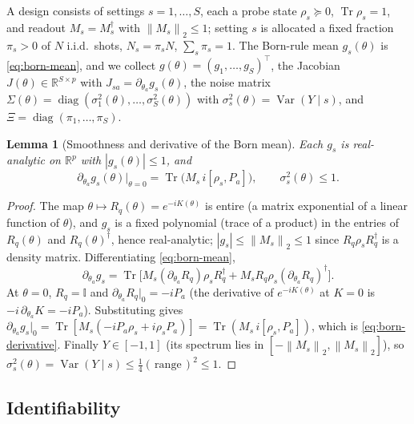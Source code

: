 \documentclass[aps,prxquantum,reprint,superscriptaddress,nofootinbib,amsmath,amssymb]{revtex4-2}
\newcommand{\norm}[1]{\left\lVert #1 \right\rVert}
\newcommand{\abs}[1]{\left\lvert #1 \right\rvert}
\newcommand{\Tr}{\operatorname{Tr}}
\newcommand{\id}{\mathbb{I}}
\newtheorem{lemma}{Lemma}
\begin{document}
A design consists of settings $s=1,\dots,S$, each a probe state $\rho_s\succeq0$, $\Tr\rho_s=1$, and readout $M_s=M_s^\dagger$ with $\norm{M_s}_2\leq1$; setting $s$ is allocated a fixed fraction $\pi_s>0$ of $N$ i.i.d.\ shots, $N_s=\pi_sN$, $\sum_s\pi_s=1$. The Born-rule mean $g_s(\theta)$ is \eqref{eq:born-mean}, and we collect $g(\theta)=(g_1,\dots,g_S)^\top$, the Jacobian $J(\theta)\in\mathbb{R}^{S\times p}$ with $J_{sa}=\partial_{\theta_a}g_s(\theta)$, the noise matrix $\Sigma(\theta)=\operatorname{diag}(\sigma_1^2(\theta),\dots,\sigma_S^2(\theta))$ with $\sigma_s^2(\theta)=\operatorname{Var}(Y\mid s)$, and $\Xi=\operatorname{diag}(\pi_1,\dots,\pi_S)$.

\begin{lemma}[Smoothness and derivative of the Born mean]
\label{lem:born-smooth}
Each $g_s$ is real-analytic on $\mathbb{R}^p$ with $\abs{g_s(\theta)}\leq1$, and
\begin{equation}
    \partial_{\theta_a}g_s(\theta)\big|_{\theta=0}=\Tr\!\bigl(M_s\,i[\rho_s,P_a]\bigr),
    \qquad
    \sigma_s^2(\theta)\leq1 .
    \label{eq:born-derivative}
\end{equation}
\end{lemma}

\begin{proof}
The map $\theta\mapsto R_q(\theta)=e^{-iK(\theta)}$ is entire (a matrix exponential of a linear function of $\theta$), and $g_s$ is a fixed polynomial (trace of a product) in the entries of $R_q(\theta)$ and $R_q(\theta)^\dagger$, hence real-analytic; $\abs{g_s}\leq\norm{M_s}_2\leq1$ since $R_q\rho_sR_q^\dagger$ is a density matrix. Differentiating \eqref{eq:born-mean},
\begin{equation*}
    \partial_{\theta_a}g_s=\Tr\!\bigl[M_s(\partial_{\theta_a}R_q)\rho_sR_q^\dagger+M_sR_q\rho_s(\partial_{\theta_a}R_q)^\dagger\bigr].
\end{equation*}
At $\theta=0$, $R_q=\id$ and $\partial_{\theta_a}R_q\big|_0=-iP_a$ (the derivative of $e^{-iK(\theta)}$ at $K=0$ is $-i\,\partial_{\theta_a}K=-iP_a$). Substituting gives $\partial_{\theta_a}g_s\big|_0=\Tr[M_s(-iP_a\rho_s+i\rho_sP_a)]=\Tr(M_s\,i[\rho_s,P_a])$, which is \eqref{eq:born-derivative}. Finally $Y\in[-1,1]$ (its spectrum lies in $[-\norm{M_s}_2,\norm{M_s}_2]$), so $\sigma_s^2(\theta)=\operatorname{Var}(Y\mid s)\leq\tfrac14(\,\mathrm{range}\,)^2\leq1$.
\end{proof}

\subsection{Identifiability}
\label{app:inference-ident}
\end{document}

